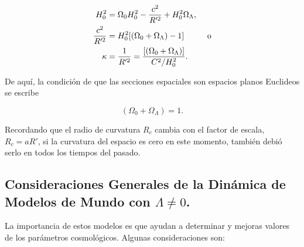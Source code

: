 \documentclass[11pt]{article}
\begin{document}
    \begin{align}
        H_0^2 & = \Omega_0 H_0^2  - \frac{c^2}{R'^2} +  H_0^2 \Omega_{\Lambda}, \notag \\
        \frac{c^2}{R'^2} & = H_0^2 [(\Omega_0 + \Omega_{\Lambda}) - 1] \hspace{1cm} \text{o} \\
        \kappa & = \frac{1}{R'^2} = \frac{[(\Omega_0 + \Omega_{\Lambda})]}{C^2/H_0^2}.
    \end{align}
        
   De aquí, la condición de que las secciones espaciales son espacios planos Euclideos se escribe 
   
   $$(\Omega_0 + \Omega_{\Lambda}) = 1.$$
   
   Recordando que el radio de curvatura $R_c$ cambia con el factor de escala, $R_c=aR'$, si la curvatura del espacio es cero en este momento, también debió serlo en todos los tiempos del pasado. 
    
    
    
    \subsection{Consideraciones Generales de la Dinámica de Modelos de Mundo con $\Lambda \neq 0$. }
    
    La importancia de estos modelos es que ayudan a determinar y mejoras valores de los parámetros cosmológicos. Algunas consideraciones son: 
    
\end{document}
